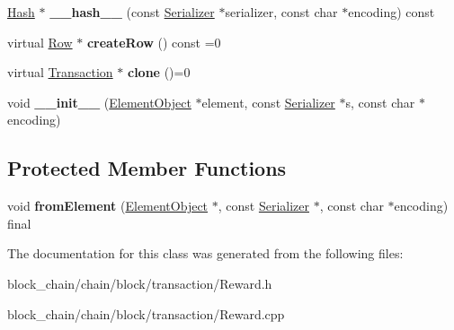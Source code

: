 \begin{DoxyCompactItemize}
\item 
\mbox{\label{classTransaction_a1f0df166c34d6a38a991544cf98c0356}} 
\mbox{\hyperlink{classHash}{Hash}} $\ast$ {\bfseries \+\_\+\+\_\+hash\+\_\+\+\_\+} (const \mbox{\hyperlink{classSerializer}{Serializer}} $\ast$serializer, const char $\ast$encoding) const
\item 
\mbox{\label{classTransaction_aa80b621537fe480dcb4444bba703abe5}} 
virtual \mbox{\hyperlink{classRow}{Row}} $\ast$ {\bfseries create\+Row} () const =0
\item 
\mbox{\label{classTransaction_ad6ee9c5e4067b2f5c950c6aad131b3e4}} 
virtual \mbox{\hyperlink{classTransaction}{Transaction}} $\ast$ {\bfseries clone} ()=0
\item 
\mbox{\label{classComponent_a28212595f8ee85fe009bd233bc99b2fc}} 
void {\bfseries \+\_\+\+\_\+init\+\_\+\+\_\+} (\mbox{\hyperlink{classElementObject}{Element\+Object}} $\ast$element, const \mbox{\hyperlink{classSerializer}{Serializer}} $\ast$s, const char $\ast$encoding)
\end{DoxyCompactItemize}
\subsection*{Protected Member Functions}
\begin{DoxyCompactItemize}
\item 
\mbox{\label{classReward_a6d16e21b60b7f11c7aaf0098a53118a2}} 
void {\bfseries from\+Element} (\mbox{\hyperlink{classElementObject}{Element\+Object}} $\ast$, const \mbox{\hyperlink{classSerializer}{Serializer}} $\ast$, const char $\ast$encoding) final
\end{DoxyCompactItemize}


The documentation for this class was generated from the following files\+:\begin{DoxyCompactItemize}
\item 
block\+\_\+chain/chain/block/transaction/Reward.\+h\item 
block\+\_\+chain/chain/block/transaction/Reward.\+cpp\end{DoxyCompactItemize}
